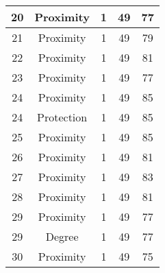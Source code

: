 \documentclass[results.tex]{subfiles}
\begin{document}
\begin{center}
\begin{tabular}{| c || c | c | c | c |}
            \hline
            20                      & Proximity                    & 1                      & 49                      & 77                   \\
            \hline
            21                      & Proximity                    & 1                      & 49                      & 79                   \\
            \hline
            22                      & Proximity                    & 1                      & 49                      & 81                   \\
            \hline
            23                      & Proximity                    & 1                      & 49                      & 77                   \\
            \hline
            24                      & Proximity                    & 1                      & 49                      & 85                   \\
            \hline
            24                      & Protection                   & 1                      & 49                      & 85                   \\
            \hline
            25                      & Proximity                    & 1                      & 49                      & 85                   \\
            \hline
            26                      & Proximity                    & 1                      & 49                      & 81                   \\
            \hline
            27                      & Proximity                    & 1                      & 49                      & 83                   \\
            \hline
            28                      & Proximity                    & 1                      & 49                      & 81                   \\
            \hline
            29                      & Proximity                    & 1                      & 49                      & 77                   \\
            \hline
            29                      & Degree                       & 1                      & 49                      & 77                   \\
            \hline
            30                      & Proximity                    & 1                      & 49                      & 75                   \\

\end{tabular}
\end{center}
\end{document}
